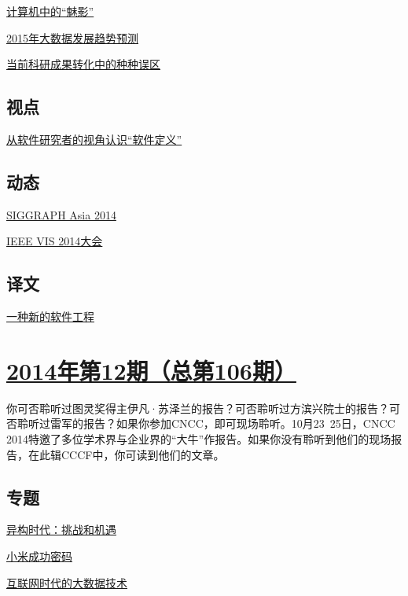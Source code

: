 \documentclass[a4paper]{article}
\begin{document}
\href{http://history.ccf.org.cn/resources/1190201776262/2015/01/12/11.pdf}{计算机中的“魅影”}

\href{http://history.ccf.org.cn/resources/1190201776262/2015/01/12/8.pdf}{2015年大数据发展趋势预测}

\href{http://history.ccf.org.cn/resources/1190201776262/2015/01/12/9.pdf}{当前科研成果转化中的种种误区}

\subsection{视点}
\href{http://history.ccf.org.cn/resources/1190201776262/2015/01/13/12.pdf}{从软件研究者的视角认识“软件定义”}

\subsection{动态}
\href{http://history.ccf.org.cn/resources/1190201776262/2015/01/12/13.pdf}{SIGGRAPH Asia 2014}

\href{http://history.ccf.org.cn/resources/1190201776262/2015/01/12/14.pdf}{IEEE VIS 2014大会}

\subsection{译文}
\href{http://history.ccf.org.cn/resources/1190201776262/2015/01/13/15.pdf}{一种新的软件工程}


\section{\href{http://history.ccf.org.cn/sites/ccf/jsjtbbd.jsp?contentId=2836201103891}{\textbf{2014年第12期（总第106期）}}}
你可否聆听过图灵奖得主伊凡·苏泽兰的报告？可否聆听过方滨兴院士的报告？可否聆听过雷军的报告？如果你参加CNCC，即可现场聆听。10月23~25日，CNCC 2014特邀了多位学术界与企业界的“大牛”作报告。如果你没有聆听到他们的现场报告，在此辑CCCF中，你可读到他们的文章。
\subsection{专题}
\href{http://history.ccf.org.cn/resources/1190201776262/2014/12/11/2.pdf}{异构时代：挑战和机遇}

\href{http://history.ccf.org.cn/resources/1190201776262/2014/12/11/4.pdf}{小米成功密码}

\href{http://history.ccf.org.cn/resources/1190201776262/2014/12/11/6.pdf}{互联网时代的大数据技术}
\end{document}
